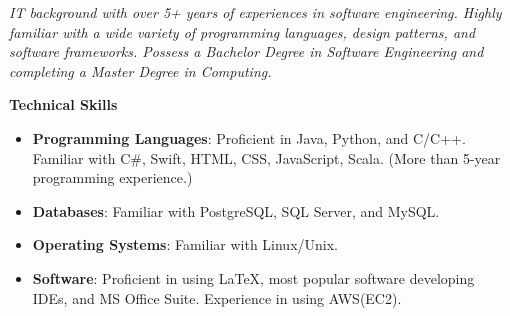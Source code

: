 \documentclass{res}
\newcommand{\resheading}[1]{{\normalsize \colorbox{mygrey}{\begin{minipage}{\textwidth}{\textbf{#1 \vphantom{p\^{E}}}}\end{minipage}}}}
\begin{document}
\begin{resume}
\begin{CJK*}{UTF8}{song}
\normalsize

\vspace*{-0.8cm}
\textit{IT background with over 5+ years of experiences in software engineering. Highly familiar with a wide variety of programming languages, design patterns, and software frameworks. Possess a Bachelor Degree in Software Engineering and completing a Master Degree in Computing.}

%



%

\resheading{Technical Skills}
\begin{itemize}
\itemsep -2pt %
  \item{\bf Programming Languages}: Proficient in Java, Python, and C/C++. Familiar with C\#, Swift, HTML, CSS, JavaScript, Scala. (More than 5-year programming experience.)
  \item{\bf Databases}: Familiar with PostgreSQL, SQL Server, and MySQL.
  \item{\bf Operating Systems}: Familiar with Linux/Unix.
  \item{\bf Software}: Proficient in using \LaTeX, most popular software developing IDEs, and MS Office Suite. Experience in using AWS(EC2).
\end{itemize}




\end{CJK*}
\end{resume}
\end{document}
